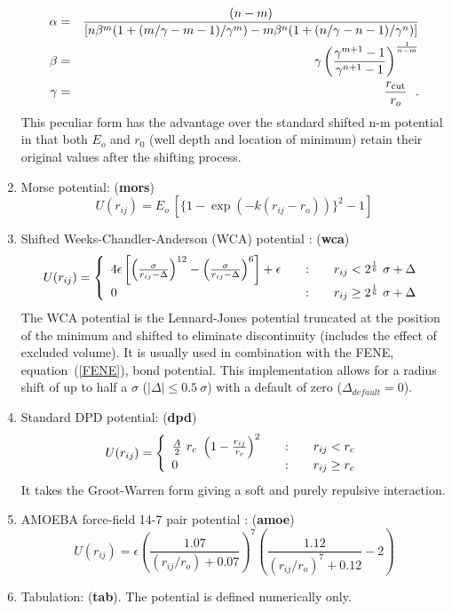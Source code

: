 \begin{enumerate}
\begin{eqnarray}
\alpha&=&\frac{(n-m)}{[n\beta^{m}(1+(m/\gamma-m-1)/\gamma^{m})-
m\beta^{n}(1+(n/\gamma-n-1)/\gamma^{n})]} \nonumber \\
\beta &=& \gamma\left( \frac{\gamma^{m+1}-1}{\gamma^{n+1}-1}
\right)^{\frac{1}{n-m}} \\
\gamma &=& \frac{r_{\rm cut}}{r_{o}}~~. \nonumber
\end{eqnarray}
This peculiar form has the advantage over the standard shifted n-m
potential in that both $E_{o}$ and $r_{0}$ (well depth and location of
minimum) retain their original values after the shifting process.
\item Morse potential:  ({\bf mors})
\begin{equation}
U(r_{ij}) = E_{o}~[\{1-\exp(-k(r_{ij}-r_{o}))\}^{2}-1]
\end{equation}
\item Shifted Weeks-Chandler-Anderson (WCA) potential \cite{weeks-71a}:  ({\bf wca})
\begin{equation}
U(r_{ij}) = \left\{ \begin{array} {l@{\qquad:\qquad}l}
4\epsilon\left[\left(\frac{\sigma}{r_{ij}-\Delta}\right)^{12}-\left(\frac{\sigma}{r_{ij}-\Delta}\right)^{6}\right]
+\epsilon & r_{ij} < 2^{1 \over 6}~\sigma + \Delta \\
0 & r_{ij} \ge 2^{1 \over 6}~\sigma + \Delta \end{array} \right. \label{wca}
\end{equation}
The WCA potential is the Lennard-Jones potential truncated at the
position of the minimum and shifted to eliminate discontinuity
(includes the effect of excluded volume).  It is usually used in
combination with the FENE, equation~(\ref{FENE}), bond potential.  This
implementation allows for a radius shift of up to half a $\sigma$
($|\Delta| \le 0.5~\sigma$) with a default of zero
($\Delta_{default} = 0$).
\item Standard DPD potential:  ({\bf dpd})
\begin{equation}
U(r_{ij}) = \left\{ \begin{array} {l@{\qquad:\qquad}l}
\frac{A}{2}~r_{c}~\left(1-\frac{r_{ij}}{r_{c}}\right)^{2} & r_{ij} < r_{c} \\
0 & r_{ij} \ge r_{c} \end{array} \right.
\end{equation}
It takes the Groot-Warren \cite{groot-71a} form giving a soft and purely repulsive interaction.
\item AMOEBA force-field 14-7 pair potential \cite{ponder-10a}:  ({\bf amoe})
\begin{equation}
U(r_{ij}) = \epsilon\left(\frac{1.07}{(r_{ij}/r_{o})+0.07}\right)^{7}\left(\frac{1.12}{(r_{ij}/r_{o})^{7}+0.12}-2\right)
\end{equation}
\item Tabulation:  ({\bf tab}).  The potential is defined
numerically only.
\end{enumerate}

